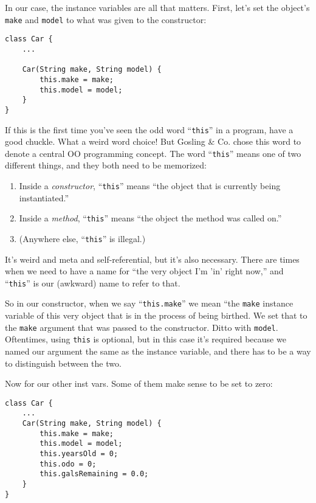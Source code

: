 In our case, the instance variables are all that matters. First, let's set the
object's \texttt{make} and \texttt{model} to what was given to the
constructor:

\begin{Verbatim}[samepage=true,fontsize=\footnotesize,frame=single]
class Car {
    ...

    Car(String make, String model) {
        this.make = make;
        this.model = model;
    }
}
\end{Verbatim}
\normalsize

If this is the first time you've seen the odd word ``\texttt{this}'' in a
program, have a good chuckle. What a weird word choice! But Gosling \& Co.
chose this word to denote a central OO programming concept. The word
``\texttt{this}'' means one of two different things, and they both need to be
memorized:

\begin{enumerate}
\large
\itemsep.1em
\item Inside a \textit{constructor}, ``\texttt{this}'' means ``the object that is
currently being instantiated.''
\item Inside a \textit{method}, ``\texttt{this}'' means ``the object the
method was called on.''
\item (Anywhere else, ``\texttt{this}'' is illegal.)
\normalsize
\end{enumerate}

It's weird and meta and self-referential, but it's also necessary. There are
times when we need to have a name for ``the very object I'm 'in' right now,''
and ``\texttt{this}'' is our (awkward) name to refer to that.

So in our constructor, when we say ``\texttt{this.make}'' we mean ``the
\texttt{make} instance variable of this very object that is in the process of
being birthed. We set that to the \texttt{make} argument that was passed to
the constructor. Ditto with \texttt{model}. Oftentimes, using \texttt{this} is
optional, but in this case it's required because we named our argument the
same as the instance variable, and there has to be a way to distinguish
between the two.

Now for our other inst vars. Some of them make sense to be set to zero:

\begin{Verbatim}[samepage=true,fontsize=\footnotesize,frame=single]
class Car {
    ...
    Car(String make, String model) {
        this.make = make;
        this.model = model;
        this.yearsOld = 0;
        this.odo = 0;
        this.galsRemaining = 0.0;
    }
}
\end{Verbatim}

